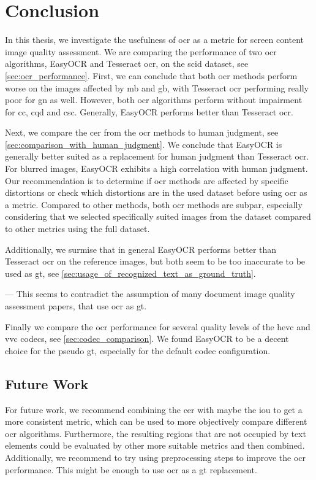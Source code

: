 \chapter{Conclusion}
\label{chap:conclusion}

In this thesis, we investigate the usefulness of \gls{ocr} as a metric for screen content image quality assessment.
We are comparing the performance of two \gls{ocr} algorithms, EasyOCR and Tesseract \gls{ocr}, on the \gls{scid} dataset, see \autoref{sec:ocr_performance}.
First, we can conclude that both \gls{ocr} methods perform worse on the images affected by \gls{mb} and \gls{gb}, with Tesseract \gls{ocr} performing really poor for \gls{gn} as well.
However, both \gls{ocr} algorithms perform without impairment for \gls{cc}, \gls{cqd} and \gls{csc}.
Generally, EasyOCR performs better than Tesseract \gls{ocr}.

Next, we compare the \gls{cer} from the \gls{ocr} methods to human judgment, see \autoref{sec:comparison_with_human_judgment}.
We conclude that EasyOCR is generally better suited as a replacement for human judgment than Tesseract \gls{ocr}.
For blurred images, EasyOCR exhibits a high correlation with human judgment.
Our recommendation is to determine if \gls{ocr} methods are affected by specific distortions or check which distortions are in the used dataset before using \gls{ocr} as a metric.
Compared to other methods, both \gls{ocr} methods are subpar, especially considering that we selected specifically suited images from the dataset compared to other metrics using the full dataset.

Additionally, we surmise that in general EasyOCR performs better than Tesseract \gls{ocr} on the reference images, but both seem to be too inaccurate to be used as \gls{gt}, see \autoref{sec:usage_of_recognized_text_as_ground_truth}.

--- This seems to contradict the assumption of many document image quality assessment papers, that use \gls{ocr} as \gls{gt}.

Finally we compare the \gls{ocr} performance for several quality levels of the \gls{hevc} and \gls{vvc} codecs, see \autoref{sec:codec_comparison}.
We found EasyOCR to be a decent choice for the pseudo \gls{gt}, especially for the default codec configuration.


\section{Future Work}
\label{sec:future}

For future work, we recommend combining the \gls{cer} with maybe the \gls{iou} to get a more consistent metric, which can be used to more objectively compare different \gls{ocr} algorithms.
Furthermore, the resulting regions that are not occupied by text elements could be evaluated by other more suitable metrics and then combined.
Additionally, we recommend to try using preprocessing steps to improve the \gls{ocr} performance.
This might be enough to use \gls{ocr} as a \gls{gt} replacement.
